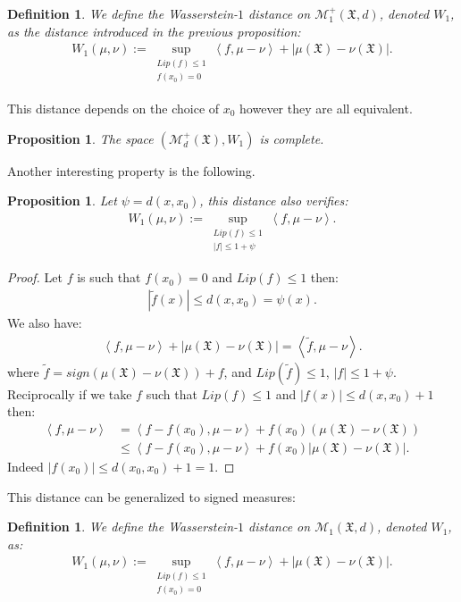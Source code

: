 \documentclass[11pt,a4paper]{article}
\newcommand{\MC}{\mathcal{M}}
\newcommand{\XF}{\mathfrak{X}}
\newcommand{\brac}[1]{\left\langle#1\right\rangle}
\newtheorem{proposition}[theorem]{Proposition}
\newtheorem{definition}[theorem]{Definition}
\begin{document}
\begin{definition}\label{def:Wasserstein-general}
We define the \emph{Wasserstein-$1$ distance} on $\MC^+_{1}(\XF,d)$, denoted $W_{1}$, as the distance introduced in the previous proposition:
\begin{align*}
    W_{1}(\mu, \nu) := \sup_{\substack{Lip(f) \leq 1\\ f(x_0) = 0}} \brac{f, \mu - \nu} + \left| \mu(\XF) - \nu(\XF) \right|.
\end{align*}
\end{definition}
This distance depends on the choice of $x_0$ however they are all equivalent.
\begin{proposition}\label{prop:completness-wasserstein}
    The space $\left(\MC_d^+(\XF), W_1 \right)$ is complete.
\end{proposition}
Another interesting property is the following.
\begin{proposition}\label{prop:equivalent-notation}
    Let $\psi = d(x,x_0)$, this distance also verifies:
\begin{align*}
    W_{1}(\mu, \nu) := \sup_{\substack{Lip(f) \leq 1\\ |f| \leq 1 + \psi }} \brac{f, \mu - \nu} .
\end{align*}
\end{proposition}
\begin{proof}
     Let $f$ is such that $f(x_0) = 0$ and $Lip(f) \leq 1$ then:
    \begin{align*}
        |\tilde{f}(x)| \leq d(x,x_0) = \psi(x).
    \end{align*}
    We also have:
    \begin{align*}
        \brac{f, \mu - \nu} + \left| \mu(\XF) - \nu(\XF) \right| = \brac{\tilde{f},\mu - \nu}.
    \end{align*}
    where $\tilde{f} = sign\left( \mu(\XF) - \nu(\XF)\right) + f$, and $Lip(\tilde{f}) \leq 1$, $|f| \leq 1 + \psi$. Reciprocally if we take $f$ such that $Lip(f) \leq 1$ and $|f(x)| \leq d(x,x_0) + 1$ then:
    \begin{align*}
        \brac{f, \mu - \nu}
        &= \brac{f - f(x_0),\mu - \nu} + f(x_0) \left(\mu(\XF) - \nu(\XF) \right) \\
        &\leq \brac{f - f(x_0),\mu - \nu} + f(x_0) \left| \mu(\XF) - \nu(\XF) \right|.
    \end{align*}
    Indeed $|f(x_0)| \leq d(x_0,x_0) + 1 = 1$.
\end{proof}
This distance can be generalized to signed measures:
\begin{definition}\label{def:Wasserstein-general-signed}
    We define the \emph{Wasserstein-$1$ distance} on $\MC_{1}(\XF,d)$, denoted $W_{1}$, as:
\begin{align*}
    W_{1}(\mu, \nu) := \sup_{\substack{Lip(f) \leq 1\\ f(x_0) = 0}} \brac{f, \mu - \nu} + \left| \mu(\XF) - \nu(\XF) \right|.
\end{align*}
\end{definition}
\end{document}
